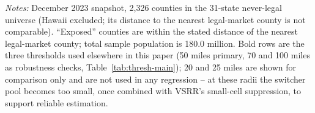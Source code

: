 \documentclass[preprint,12pt,authoryear]{elsarticle}
\begin{document}
\begin{table}[htbp]
\centering
\caption{Sample composition at alternative exposure-distance thresholds}
\label{tab:threshcomposition}
\vspace{2pt}
\begin{minipage}{0.92\textwidth}
\footnotesize\emph{Notes:} December 2023 snapshot, 2,326 counties in
the 31-state never-legal universe (Hawaii excluded; its distance to
the nearest legal-market county is not comparable). ``Exposed''
counties are within the stated distance of the nearest legal-market
county; total sample population is 180.0 million. Bold rows are the
three thresholds used elsewhere in this paper (50 miles primary, 70
and 100 miles as robustness checks, Table~\ref{tab:thresh-main}); 20
and 25 miles are shown for comparison only and are not used in any
regression -- at these radii the switcher pool becomes too small, once
combined with VSRR's small-cell suppression, to support reliable
estimation.
\end{minipage}
\end{table}
\end{document}
